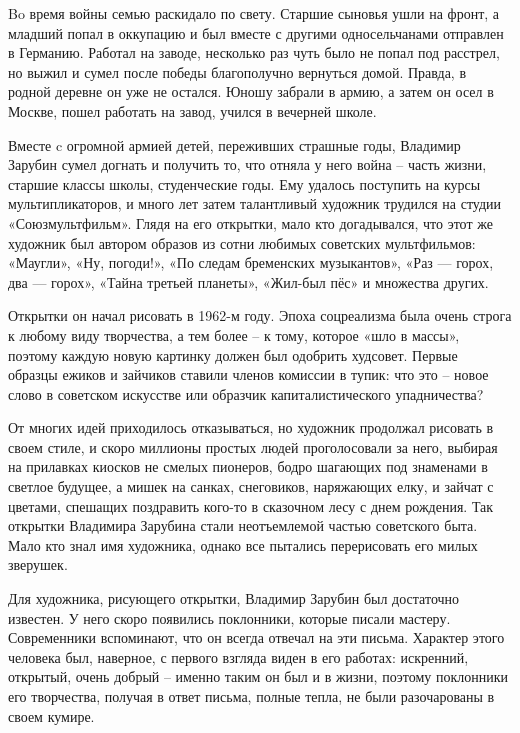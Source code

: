 \begin{multicols}{2}
\end{multicols}

Bo время войны семью раскидало по свету. Старшие сыновья ушли на фронт, а
младший попал в оккупацию и был вместе с другими односельчанами отправлен в
Германию. Работал на заводе, несколько раз чуть было не попал под расстрел, но
выжил и сумел после победы благополучно вернуться домой. Правда, в родной
деревне он уже не остался. Юношу забрали в армию, а затем он осел в Москве,
пошел работать на завод, учился в вечерней школе. 

Вместе c огромной армией детей, переживших страшные годы, Владимир Зарубин
сумел догнать и получить то, что отняла у него война – часть жизни, старшие
классы школы, студенческие годы. Ему удалось поступить на курсы
мультипликаторов, и много лет затем талантливый художник трудился на студии
«Союзмультфильм». Глядя на его открытки, мало кто догадывался, что этот же
художник был автором образов из сотни любимых советских мультфильмов: «Маугли»,
«Ну, погоди!», «По следам бременских музыкантов», «Раз — горох, два — горох»,
«Тайна третьей планеты», «Жил-был пёс» и множества других. 

Открытки он начал рисовать в 1962-м году. Эпоха соцреализма была очень строга к
любому виду творчества, а тем более – к тому, которое «шло в массы», поэтому
каждую новую картинку должен был одобрить худсовет. Первые образцы ежиков и
зайчиков ставили членов комиссии в тупик: что это – новое слово в советском
искусстве или образчик капиталистического упадничества? 

От многих идей приходилось отказываться, но художник продолжал рисовать в своем
стиле, и скоро миллионы простых людей проголосовали за него, выбирая на
прилавках киосков не смелых пионеров, бодро шагающих под знаменами в светлое
будущее, а мишек на санках, снеговиков, наряжающих елку, и зайчат с цветами,
спешащих поздравить кого-то в сказочном лесу с днем рождения. Так открытки
Владимира Зарубина стали неотъемлемой частью советского быта. Мало кто знал имя
художника, однако все пытались перерисовать его милых зверушек. 

Для художника, рисующего открытки, Владимир Зарубин был достаточно известен. У
него скоро появились поклонники, которые писали мастеру. Современники
вспоминают, что он всегда отвечал на эти письма. Характер этого человека был,
наверное, с первого взгляда виден в его работах: искренний, открытый, очень
добрый – именно таким он был и в жизни, поэтому поклонники его творчества,
получая в ответ письма, полные тепла, не были разочарованы в своем кумире. 

